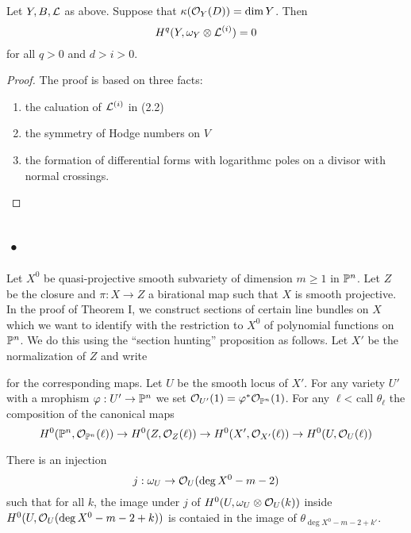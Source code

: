 \documentclass[12pt]{article}
\begin{document}
\begin{theorem}
Let $Y,B,\L$ as above. Suppose that $\kappa(\struct{Y}(D)) = \dim{Y}$. Then
\[ H^q(Y, \omega_Y \ot \L^{(i)}) = 0\]
for all $q > 0$ and $d > i > 0$.
\end{theorem}

\begin{proof}
The proof is based on three facts:
\begin{enumerate}
\item the caluation of $\L^{(i)}$ in (2.2)
\item the symmetry of Hodge numbers on $V$
\item the formation of differential forms with logarithmc poles on a divisor with normal crossings.
\end{enumerate}
\end{proof}

\subsection{•}

Let $X^0$ be quasi-projective smooth subvariety of dimension $m \ge 1$ in $\P^n$. Let $Z$ be the closure and $\pi : X \to Z$ a birational map such that $X$ is smooth projective. In the proof of Theorem I, we construct sections of certain line bundles on $X$ which we want to identify with the restriction to $X^0$ of polynomial functions on $\P^n$. We do this using the ``section hunting'' proposition as follows. Let $X'$ be the normalization of $Z$ and write
\begin{center}
\end{center}
for the corresponding maps. Let $U$ be the smooth locus of $X'$. For any variety $U'$ with a mrophism $\varphi : U' \to \P^n$ we set $\struct{U'}(1) = \varphi^* \struct{\P^n}(1)$. For any $\ell$< call $\theta_\ell$ the composition of the canonical maps
\[ H^0(\P^n, \struct{\P^n}(\ell)) \to H^0(Z, \struct{Z}(\ell)) \to H^0(X', \struct{X'}(\ell)) \to H^0(U, \struct{U}(\ell)) \]

\begin{prop}
There is an injection
\[ j : \omega_U \to \struct{U}(\deg{X^0} - m - 2) \]
such that for all $k$, the image under $j$ of $H^0(U, \omega_U \ot \struct{U}(k))$ inside $H^0(U, \struct{U}(\deg{X^0} - m - 2 +k ))$ is contaied in the image of $\theta_{\deg{X^0} - m - 2 + k'}$. 
\end{prop}
\end{document}
